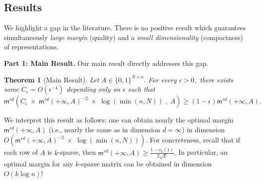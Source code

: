\documentclass[preprint]{article}
\newtheorem{theorem}{Theorem}[section]
\newcommand{\kiril}[1]{{\color{purple}\textsf{[KB: #1]}}}
\newcommand{\maxmargin}{\mathsf{m}^{rd}}
\begin{document}









\subsection{Results}\label{subsec:main-results}
We highlight a gap in the literature. There is no positive result which guarantees simultaneously \emph{large margin} (quality) and a \emph{small dimensionality} (compactness) of representations.

\textbf{Part 1: Main Result.}
Our main result directly addresses this gap. 

\begin{theorem}[Main Result] 
\label{thm:main}
Let $A\in \{0,1\}^{N\times n}.$
For every $\epsilon>0,$ there exists some $C_\epsilon = O(\epsilon^{-4})$ depending only on $\epsilon$ such that 
$$
\maxmargin(C_\epsilon \; \times \; \maxmargin(+\infty, A)^{-2}\; \times \; \log(\min(n , N))\; , \; A)\ge (1-\epsilon)\maxmargin(+\infty, A).
$$
\end{theorem}
We interpret this result as follows: one can obtain nearly the optimal margin $\maxmargin(+\infty, A)$ (i.e., nearly the same as in dimension $d=\infty$) in dimension $O(\maxmargin(+\infty, A)^{-2}\; \times \; \log(\min(n , N))).$ For concreteness, recall that if each row of $A$ is $k$-sparse, then $\maxmargin(+\infty, A) \ge \frac{1-o_k(1)}{2\sqrt{k}}.$ In particular, an optimal margin for any $k$-sparse matrix can be obtained in dimension $O(k\log n)$!
\end{document}
